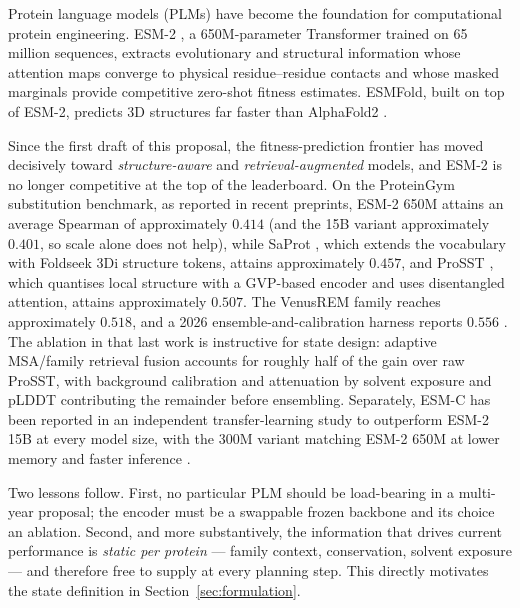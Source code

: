 \documentclass[12pt, a4paper]{article}
\begin{document}
Protein language models (PLMs) have become the foundation for computational protein engineering. ESM-2 \citep{lin2023esm2}, a 650M-parameter Transformer trained on 65 million sequences, extracts evolutionary and structural information whose attention maps converge to physical residue--residue contacts and whose masked marginals provide competitive zero-shot fitness estimates. ESMFold, built on top of ESM-2, predicts 3D structures far faster than AlphaFold2 \citep{jumper2021alphafold}.

Since the first draft of this proposal, the fitness-prediction frontier has moved decisively toward \textit{structure-aware} and \textit{retrieval-augmented} models, and ESM-2 is no longer competitive at the top of the leaderboard. On the ProteinGym substitution benchmark, as reported in recent preprints, ESM-2 650M attains an average Spearman of approximately $0.414$ (and the 15B variant approximately $0.401$, so scale alone does not help), while SaProt \citep{su2024saprot}, which extends the vocabulary with Foldseek 3Di structure tokens, attains approximately $0.457$, and ProSST \citep{li2024prosst}, which quantises local structure with a GVP-based encoder and uses disentangled attention, attains approximately $0.507$. The VenusREM family \citep{tan2025venusrem} reaches approximately $0.518$, and a 2026 ensemble-and-calibration harness reports $0.556$ \citep{venusrem2harness}. The ablation in that last work is instructive for state design: adaptive MSA/family retrieval fusion accounts for roughly half of the gain over raw ProSST, with background calibration and attenuation by solvent exposure and pLDDT contributing the remainder before ensembling. Separately, ESM-C \citep{esmcambrian} has been reported in an independent transfer-learning study to outperform ESM-2 15B at every model size, with the 300M variant matching ESM-2 650M at lower memory and faster inference \citep{medium_plm_transfer}.

Two lessons follow. First, no particular PLM should be load-bearing in a multi-year proposal; the encoder must be a swappable frozen backbone and its choice an ablation. Second, and more substantively, the information that drives current performance is \textit{static per protein} --- family context, conservation, solvent exposure --- and therefore free to supply at every planning step. This directly motivates the state definition in Section~\ref{sec:formulation}.
\end{document}
